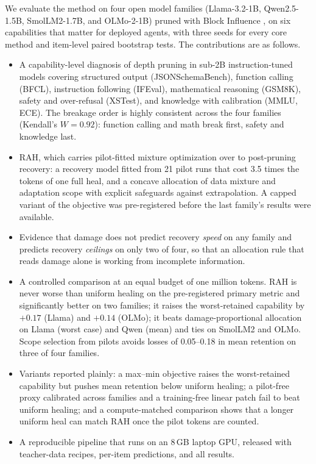 \documentclass{ieeeaccess}
\newcommand{\RAH}{RAH}
\begin{document}
We evaluate the method on four open model families (Llama-3.2-1B, Qwen2.5-1.5B, SmolLM2-1.7B, and OLMo-2-1B) pruned with Block Influence \cite{men2024shortgpt}, on six capabilities that matter for deployed agents, with three seeds for every core method and item-level paired bootstrap tests. The contributions are as follows.
\begin{itemize}
\item A capability-level diagnosis of depth pruning in sub-2B instruction-tuned models covering structured output (JSONSchemaBench), function calling (BFCL), instruction following (IFEval), mathematical reasoning (GSM8K), safety and over-refusal (XSTest), and knowledge with calibration (MMLU, ECE). The breakage order is highly consistent across the four families (Kendall's $W = 0.92$): function calling and math break first, safety and knowledge last.
\item \RAH, which carries pilot-fitted mixture optimization \cite{li2025datamixing} over to post-pruning recovery: a recovery model fitted from 21 pilot runs that cost 3.5 times the tokens of one full heal, and a concave allocation of data mixture and adaptation scope with explicit safeguards against extrapolation. A capped variant of the objective was pre-registered before the last family's results were available.
\item Evidence that damage does not predict recovery \emph{speed} on any family and predicts recovery \emph{ceilings} on only two of four, so that an allocation rule that reads damage alone is working from incomplete information.
\item A controlled comparison at an equal budget of one million tokens. \RAH{} is never worse than uniform healing on the pre-registered primary metric and significantly better on two families; it raises the worst-retained capability by $+0.17$ (Llama) and $+0.14$ (OLMo); it beats damage-proportional allocation on Llama (worst case) and Qwen (mean) and ties on SmolLM2 and OLMo. Scope selection from pilots avoids losses of 0.05--0.18 in mean retention on three of four families.
\item Variants reported plainly: a max--min objective raises the worst-retained capability but pushes mean retention below uniform healing; a pilot-free proxy calibrated across families and a training-free linear patch fail to beat uniform healing; and a compute-matched comparison shows that a longer uniform heal can match \RAH{} once the pilot tokens are counted.
\item A reproducible pipeline that runs on an 8\,GB laptop GPU, released with teacher-data recipes, per-item predictions, and all results.
\end{itemize}
\end{document}
